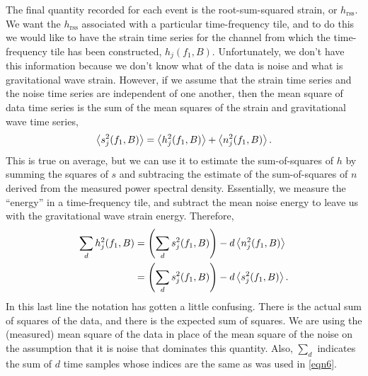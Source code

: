 \documentclass[10pt]{article}
\begin{document}
The final quantity recorded for each event is the root-sum-squared strain,
or \(h_{\text{rss}}\).  We want the \(h_{\text{rss}}\) associated with a
particular time-frequency tile, and to do this we would like to have the
strain time series for the channel from which the time-frequency tile has
been constructed, \(h_{j}(f_{1}, B)\).  Unfortunately, we don't have this
information because we don't know what of the data is noise and what is
gravitational wave strain.  However, if we assume that the strain time
series and the noise time series are independent of one another, then the
mean square of data time series is the sum of the mean squares of the
strain and gravitational wave time series,
\begin{equation}
\left\langle s_{j}^{2}(f_{1}, B)\right\rangle
   = \left\langle h_{j}^{2}(f_{1}, B)\right\rangle + \left\langle n_{j}^{2}(f_{1}, B)\right\rangle.
\end{equation}
This is true on average, but we can use it to estimate the sum-of-squares
of \(h\) by summing the squares of \(s\) and subtracing the estimate of the
sum-of-squares of \(n\) derived from the measured power spectral density.
Essentially, we measure the ``energy'' in a time-frequency tile, and
subtract the mean noise energy to leave us with the gravitational wave
strain energy.  Therefore,
\begin{align}
\sum_{d} h_{j}^{2}(f_{1}, B)
   & = \left( \sum_{d} s_{j}^{2}(f_{1}, B) \right) - d
   \left\langle n_{j}^{2}(f_{1}, B)\right\rangle
   \\
   & = \left( \sum_{d} s_{j}^{2}(f_{1}, B) \right) - d
   \left\langle s_{j}^{2}(f_{1}, B)\right\rangle.
\end{align}
In this last line the notation has gotten a little confusing.  There is the
actual sum of squares of the data, and there is the expected sum of
squares.  We are using the (measured) mean square of the data in place of
the mean square of the noise on the assumption that it is noise that
dominates this quantity.  Also, \(\sum_{d}\) indicates the sum of \(d\)
time samples whose indices are the same as was used in \eqref{eqn6}.
\end{document}
